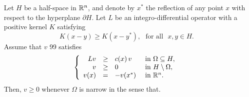\begin{proposition}
	\label{Prop:MaxPrpNarrowOdd}
	Let $H$ be a half-space in $\mathbb{R}^n$, and denote by $x^*$ the reflection of any point $x$ with respect to the hyperplane $\partial H$. Let $L$ be an integro-differential operator with a positive kernel $K$ satisfying
	\begin{equation}
	\label{Eq:KernelSymmetry}
	K(x-y) \geq K(x-y^*), \,\,\,\,\text{for all } \,\, x,y\in H.
	\end{equation}
	Assume that $v $ 99 satisfies 
	\begin{equation}
	\left\{\begin{array}{rcll}
	L v &\geq& c(x)\,v  &\textrm{ in } \Omega\subseteq H,\\
	v &\geq& 0 &\textrm{ in } H\setminus\Omega,\\
	v(x) &=& -v(x^*) &\textrm{ in } \mathbb{R}^n.
	\end{array} \right.
	\end{equation}
	Then, $v \geq 0$ whenever $\Omega$ is narrow in the sense that.
\end{proposition}

